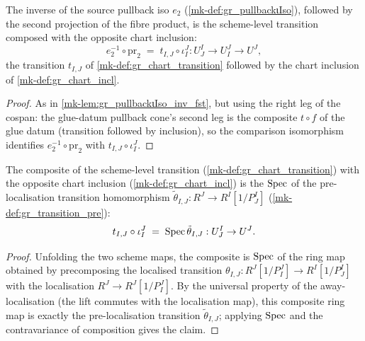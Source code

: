 \begin{lemma}\label{mk-lem:gr_pullbackιIso_inv_snd}
  \leanok

  The inverse of the source pullback iso \(e_2\) (\ref{mk-def:gr_pullbackιIso}),
  followed by the second projection of the fibre product, is the scheme-level
  transition composed with the opposite chart inclusion:
  \[
    e_2^{-1} \circ \mathrm{pr}_2
      \;=\; t_{I,J} \circ \iota^J_I : U^I_J \to U^J_I \to U^J ,
  \]
  the transition \(t_{I,J}\) of \ref{mk-def:gr_chart_transition} followed by the
  chart inclusion of \ref{mk-def:gr_chart_incl}.
\end{lemma}
\begin{proof}
  \leanok
  As in \ref{mk-lem:gr_pullbackιIso_inv_fst}, but using the right leg of the cospan:
  the glue-datum pullback cone's second leg is the composite \(t \circ f\) of the
  glue datum (transition followed by inclusion), so the comparison isomorphism
  identifies \(e_2^{-1} \circ \mathrm{pr}_2\) with \(t_{I,J} \circ \iota^J_I\).
\end{proof}

\begin{lemma}\label{mk-lem:gr_chartTransition_comp_chartIncl}
  \leanok

  The composite of the scheme-level transition
  (\ref{mk-def:gr_chart_transition}) with the opposite chart inclusion
  (\ref{mk-def:gr_chart_incl}) is the \(\operatorname{Spec}\) of the pre-localisation transition
  homomorphism \(\tilde\theta_{I,J} : R^J \to R^I[1/P^I_J]\)
  (\ref{mk-def:gr_transition_pre}):
  \[
    t_{I,J} \circ \iota^J_I \;=\; \operatorname{Spec} \tilde\theta_{I,J} :
      U^I_J \to U^J .
  \]
\end{lemma}
\begin{proof}
  \leanok
  Unfolding the two scheme maps, the composite is \(\operatorname{Spec}\) of the ring map
  obtained by precomposing the localised transition \(\theta_{I,J} :
  R^J[1/P^J_I] \to R^I[1/P^I_J]\) with the localisation \(R^J \to R^J[1/P^J_I]\).
  By the universal property of the away-localisation (the lift commutes with the
  localisation map), this composite ring map is exactly the pre-localisation
  transition \(\tilde\theta_{I,J}\); applying \(\operatorname{Spec}\) and the contravariance of
  composition gives the claim.
\end{proof}


